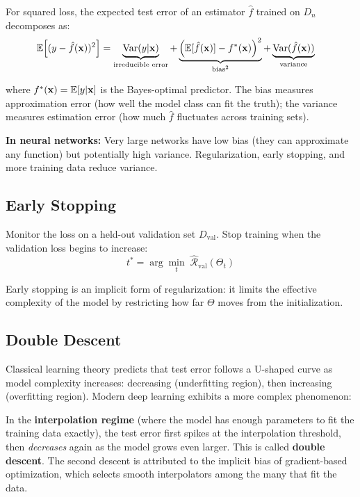 \documentclass[main.tex]{subfiles}
\begin{document}
For squared loss, the expected test error of an estimator $\hat{f}$ trained on $D_n$ decomposes as:
\begin{align}
\mathbb{E}\!\left[(y - \hat{f}(\mathbf{x}))^2\right] &= \underbrace{\text{Var}(y|\mathbf{x})}_{\text{irreducible error}} + \underbrace{\left(\mathbb{E}[\hat{f}(\mathbf{x})] - f^*(\mathbf{x})\right)^2}_{\text{bias}^2} + \underbrace{\text{Var}(\hat{f}(\mathbf{x}))}_{\text{variance}}
\end{align}

where $f^*(\mathbf{x}) = \mathbb{E}[y|\mathbf{x}]$ is the Bayes-optimal predictor. The bias measures approximation error (how well the model class can fit the truth); the variance measures estimation error (how much $\hat{f}$ fluctuates across training sets).

\textbf{In neural networks:} Very large networks have low bias (they can approximate any function) but potentially high variance. Regularization, early stopping, and more training data reduce variance.

\subsection{Early Stopping}

Monitor the loss on a held-out validation set $D_{\text{val}}$. Stop training when the validation loss begins to increase:
$$t^* = \arg\min_{t}\;\hat{\mathcal{R}}_{\text{val}}(\Theta_t)$$

Early stopping is an implicit form of regularization: it limits the effective complexity of the model by restricting how far $\Theta$ moves from the initialization.

\subsection{Double Descent}

Classical learning theory predicts that test error follows a U-shaped curve as model complexity increases: decreasing (underfitting region), then increasing (overfitting region). Modern deep learning exhibits a more complex phenomenon:

In the \textbf{interpolation regime} (where the model has enough parameters to fit the training data exactly), the test error first spikes at the interpolation threshold, then \textit{decreases} again as the model grows even larger. This is called \textbf{double descent}. The second descent is attributed to the implicit bias of gradient-based optimization, which selects smooth interpolators among the many that fit the data.
\end{document}
